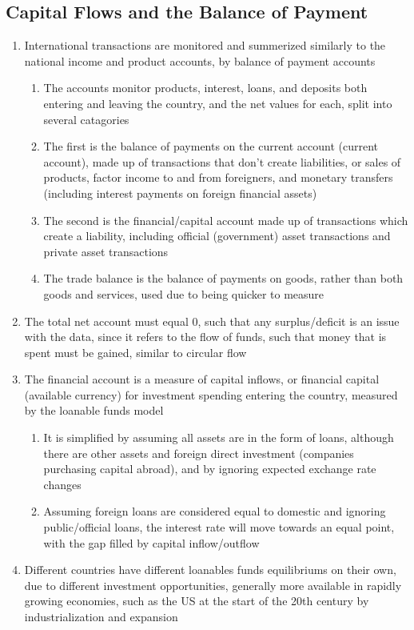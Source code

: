 \documentclass[11 pt, twoside]{article}
\begin{document}
\subsection{Capital Flows and the Balance of Payment}
\begin{enumerate}
\item International transactions are monitored and summerized similarly to the national income and product accounts, by balance of payment accounts
\begin{enumerate}
\item The accounts monitor products, interest, loans, and deposits both entering and leaving the country, and the net values for each, split into several catagories
\item The first is the balance of payments on the current account (current account), made up of transactions that don't create liabilities, or sales of products, factor income to and from foreigners, and monetary transfers (including interest payments on foreign financial assets)
\item The second is the financial/capital account made up of transactions which create a liability, including official (government) asset transactions and private asset transactions
\item The trade balance is the balance of payments on goods, rather than both goods and services, used due to being quicker to measure
\end{enumerate}
\item The total net account must equal 0, such that any surplus/deficit is an issue with the data, since it refers to the flow of funds, such that money that is spent must be gained, similar to circular flow
\item The financial account is a measure of capital inflows, or financial capital (available currency) for investment spending entering the country, measured by the loanable funds model
\begin{enumerate}
\item It is simplified by assuming all assets are in the form of loans, although there are other assets and foreign direct investment (companies purchasing capital abroad), and by ignoring expected exchange rate changes
\item Assuming foreign loans are considered equal to domestic and ignoring public/official loans, the interest rate will move towards an equal point, with the gap filled by capital inflow/outflow
\end{enumerate}
\item Different countries have different loanables funds equilibriums on their own, due to different investment opportunities, generally more available in rapidly growing economies, such as the US at the start of the 20th century by industrialization and expansion

\end{enumerate}
\end{document}
